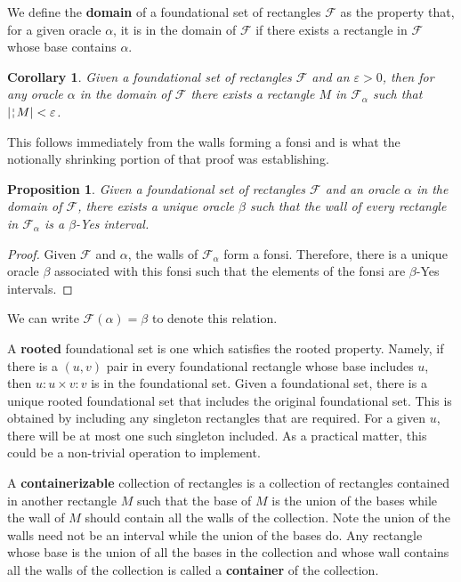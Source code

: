 \documentclass[12pt]{article}
\newtheorem{corollary}{Corollary}[section]
\newtheorem{proposition}{Proposition}[section]
\begin{document}
We define the \textbf{domain} of a foundational set of rectangles $\mathcal{F}$ as the property that, for a given oracle $\alpha$, it is in the domain of $\mathcal{F}$ if there exists a rectangle in $\mathcal{F}$ whose base contains $\alpha$.

\begin{corollary}\label{cor:fshrink}
Given a foundational set of rectangles $\mathcal{F}$ and an $\varepsilon > 0$, then for any oracle $\alpha$ in the domain of $\mathcal{F}$ there exists a rectangle $M$ in $\mathcal{F}_{\alpha}$ such that $|\wall{M}| < \varepsilon$.
\end{corollary}

This follows immediately from the walls forming a fonsi and is what the notionally shrinking portion of that proof was establishing. 

\begin{proposition}\label{pr:classfun}
Given a foundational set of rectangles $\mathcal{F}$ and an oracle $\alpha$ in the domain of $\mathcal{F}$, there exists a unique oracle $\beta$ such that the wall of every rectangle in $\mathcal{F}_{\alpha}$ is a $\beta$-Yes interval.
\end{proposition}

\begin{proof}
    Given $\mathcal{F}$ and $\alpha$, the walls of $\mathcal{F}_{\alpha}$ form a fonsi. Therefore, there is a unique oracle $\beta$ associated with this fonsi such that the elements of the fonsi are $\beta$-Yes intervals.
\end{proof}

We can write $\mathcal{F}(\alpha) = \beta$ to denote this relation. 

A \textbf{rooted} foundational set is one which satisfies the rooted property. Namely, if there is a $(u,v)$ pair in every foundational rectangle whose base includes $u$, then $u:u \times v:v$ is in the foundational set. Given a foundational set, there is a unique rooted foundational set that includes the original foundational set. This is obtained by including any singleton rectangles that are required. For a given $u$, there will be at most one such singleton included. As a practical matter, this could be a non-trivial operation to implement. 

A \textbf{containerizable} collection of rectangles is a collection of rectangles contained in another rectangle $M$ such that the base of $M$ is the union of the bases while the wall of $M$ should contain all the walls of the collection. Note the union of the walls need not be an interval while the union of the bases do. Any rectangle whose base is the union of all the bases in the collection and whose wall contains all the walls of the collection is called a \textbf{container} of the collection.
\end{document}
